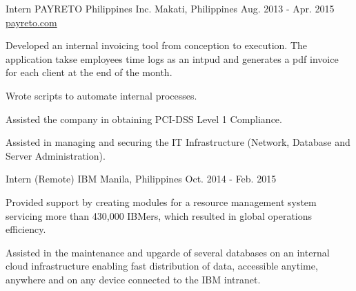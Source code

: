 \begin{cventries}
  \cventry
    {Intern} %
    {PAYRETO Philippines Inc.} %
    {Makati, Philippines} %
    {Aug. 2013 - Apr. 2015} %
    {\href{https://payreto.com}{payreto.com}} %
    {
      \begin{cvitems} %
        \item {Developed an internal invoicing tool from conception to execution. The application takse employees time logs as an intpud and generates a pdf invoice for each client at the end of the month.}
        \item {Wrote scripts to automate internal processes.}
        \item {Assisted the company in obtaining PCI-DSS Level 1 Compliance.}
        \item { Assisted in managing and securing the IT Infrastructure (Network, Database and Server Administration).}
        \end{cvitems}
    }
  \cventry
    {Intern (Remote)} %
    {IBM} %
    {Manila, Philippines} %
    {Oct. 2014 - Feb. 2015} %
    {} %
    {
      \begin{cvitems} %
        \item {Provided support by creating modules for a resource management system servicing more than 430,000 IBMers, which resulted in global operations efficiency.}
        \item {Assisted in the maintenance and upgarde of several databases on an internal cloud infrastructure enabling fast distribution of data, accessible anytime, anywhere and on any device connected to the IBM intranet.}
      \end{cvitems}
    }

\end{cventries}
